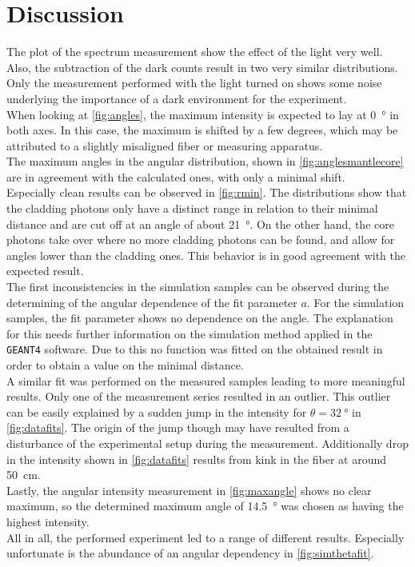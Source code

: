 \section{Discussion}
\label{sec:Discussion}

The plot of the spectrum measurement show the effect of the light very well. Also, the subtraction of the dark counts result in two very similar distributions. Only the measurement performed with the light turned on shows some noise underlying the importance of a dark environment for the experiment.\\
When looking at \autoref{fig:angles}, the maximum intensity is expected to lay at \qty{0}{\degree} in both axes. In this case, the maximum is shifted by a few degrees, which may be attributed to a slightly misaligned fiber or measuring apparatus.\\
The maximum angles in the angular distribution, shown in \autoref{fig:anglesmantlecore} are in agreement with the calculated ones, with only a minimal shift. \\ %
Especially clean results can be observed in \autoref{fig:rmin}. The distributions show that the cladding photons only have a distinct range in relation to their minimal distance and are cut off at an angle of about \qty{21}{\degree}. On the other hand, the core photons take over where no more cladding photons can be found, and allow for angles lower than the cladding ones. This behavior is in good agreement with the expected result.\\
The first inconsistencies in the simulation samples can be observed during the determining of the angular dependence of the fit parameter $a$. For the simulation samples, the fit parameter shows no dependence on the angle. The explanation for this needs further information on the simulation method applied in the \texttt{GEANT4} software. Due to this no function was fitted on the obtained result in order to obtain a value on the minimal distance.\\
A similar fit was performed on the measured samples leading to more meaningful results. Only one of the measurement series resulted in an outlier. 
This outlier can be easily explained by a sudden jump in the intensity for $\theta=\qty{32}{\degree}$ in \autoref{fig:datafits}. 
The origin of the jump though may have resulted from a disturbance of the experimental setup during the measurement. 
Additionally drop in the intensity shown in \autoref{fig:datafits} results from kink in the fiber at around \qty{50}{\centi\meter}.\\
Lastly, the angular intensity measurement in \autoref{fig:maxangle} shows no clear maximum, so the determined maximum angle of \qty{14.5}{\degree} was chosen as having the highest intensity.\\
All in all, the performed experiment led to a range of different results. Especially unfortunate is the abundance of an angular dependency in \autoref{fig:simthetafit}.

